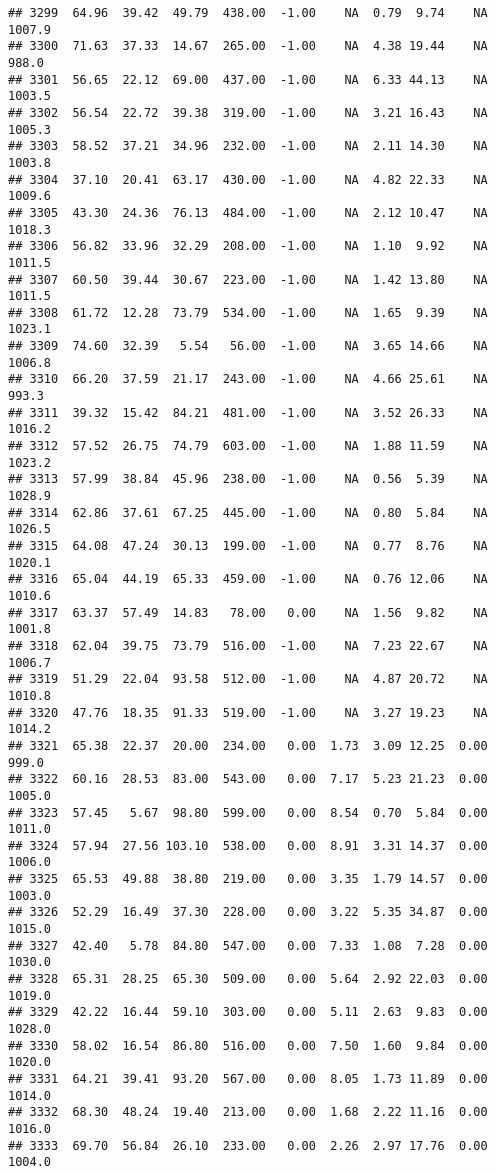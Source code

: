 \documentclass{article}\usepackage{graphicx, color}
\makeatletter
\newenvironment{kframe}{%
 \def\at@end@of@kframe{}%
 \ifinner\ifhmode%
  \def\at@end@of@kframe{\end{minipage}}%
  \begin{minipage}{\columnwidth}%
 \fi\fi%
 \def\FrameCommand##1{\hskip\@totalleftmargin \hskip-\fboxsep
 \colorbox{shadecolor}{##1}\hskip-\fboxsep
     \hskip-\linewidth \hskip-\@totalleftmargin \hskip\columnwidth}%
 \MakeFramed {\advance\hsize-\width
   \@totalleftmargin\z@ \linewidth\hsize
   \@setminipage}}%
 {\par\unskip\endMakeFramed%
 \at@end@of@kframe}
\newenvironment{knitrout}{}{} %
\makeatother
\begin{document}
\begin{knitrout}
\begin{kframe}
\begin{verbatim}
## 3299  64.96  39.42  49.79  438.00  -1.00    NA  0.79  9.74    NA 1007.9
## 3300  71.63  37.33  14.67  265.00  -1.00    NA  4.38 19.44    NA  988.0
## 3301  56.65  22.12  69.00  437.00  -1.00    NA  6.33 44.13    NA 1003.5
## 3302  56.54  22.72  39.38  319.00  -1.00    NA  3.21 16.43    NA 1005.3
## 3303  58.52  37.21  34.96  232.00  -1.00    NA  2.11 14.30    NA 1003.8
## 3304  37.10  20.41  63.17  430.00  -1.00    NA  4.82 22.33    NA 1009.6
## 3305  43.30  24.36  76.13  484.00  -1.00    NA  2.12 10.47    NA 1018.3
## 3306  56.82  33.96  32.29  208.00  -1.00    NA  1.10  9.92    NA 1011.5
## 3307  60.50  39.44  30.67  223.00  -1.00    NA  1.42 13.80    NA 1011.5
## 3308  61.72  12.28  73.79  534.00  -1.00    NA  1.65  9.39    NA 1023.1
## 3309  74.60  32.39   5.54   56.00  -1.00    NA  3.65 14.66    NA 1006.8
## 3310  66.20  37.59  21.17  243.00  -1.00    NA  4.66 25.61    NA  993.3
## 3311  39.32  15.42  84.21  481.00  -1.00    NA  3.52 26.33    NA 1016.2
## 3312  57.52  26.75  74.79  603.00  -1.00    NA  1.88 11.59    NA 1023.2
## 3313  57.99  38.84  45.96  238.00  -1.00    NA  0.56  5.39    NA 1028.9
## 3314  62.86  37.61  67.25  445.00  -1.00    NA  0.80  5.84    NA 1026.5
## 3315  64.08  47.24  30.13  199.00  -1.00    NA  0.77  8.76    NA 1020.1
## 3316  65.04  44.19  65.33  459.00  -1.00    NA  0.76 12.06    NA 1010.6
## 3317  63.37  57.49  14.83   78.00   0.00    NA  1.56  9.82    NA 1001.8
## 3318  62.04  39.75  73.79  516.00  -1.00    NA  7.23 22.67    NA 1006.7
## 3319  51.29  22.04  93.58  512.00  -1.00    NA  4.87 20.72    NA 1010.8
## 3320  47.76  18.35  91.33  519.00  -1.00    NA  3.27 19.23    NA 1014.2
## 3321  65.38  22.37  20.00  234.00   0.00  1.73  3.09 12.25  0.00  999.0
## 3322  60.16  28.53  83.00  543.00   0.00  7.17  5.23 21.23  0.00 1005.0
## 3323  57.45   5.67  98.80  599.00   0.00  8.54  0.70  5.84  0.00 1011.0
## 3324  57.94  27.56 103.10  538.00   0.00  8.91  3.31 14.37  0.00 1006.0
## 3325  65.53  49.88  38.80  219.00   0.00  3.35  1.79 14.57  0.00 1003.0
## 3326  52.29  16.49  37.30  228.00   0.00  3.22  5.35 34.87  0.00 1015.0
## 3327  42.40   5.78  84.80  547.00   0.00  7.33  1.08  7.28  0.00 1030.0
## 3328  65.31  28.25  65.30  509.00   0.00  5.64  2.92 22.03  0.00 1019.0
## 3329  42.22  16.44  59.10  303.00   0.00  5.11  2.63  9.83  0.00 1028.0
## 3330  58.02  16.54  86.80  516.00   0.00  7.50  1.60  9.84  0.00 1020.0
## 3331  64.21  39.41  93.20  567.00   0.00  8.05  1.73 11.89  0.00 1014.0
## 3332  68.30  48.24  19.40  213.00   0.00  1.68  2.22 11.16  0.00 1016.0
## 3333  69.70  56.84  26.10  233.00   0.00  2.26  2.97 17.76  0.00 1004.0

\end{verbatim}
\end{kframe}
\end{knitrout}
\end{document}
